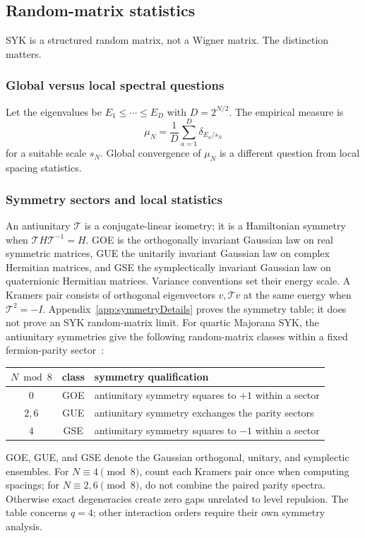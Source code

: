 \documentclass[11pt]{article}
\numberwithin{equation}{section}
\theoremstyle{exposition}
\theoremstyle{result}
\begin{document}
\subsection{Random-matrix statistics}

SYK is a structured random matrix, not a Wigner matrix. The distinction matters.

\subsubsection{Global versus local spectral questions}

Let the eigenvalues be $E_1\le\cdots\le E_D$ with $D=2^{N/2}$. The empirical measure is
\begin{equation*}
\mu_N=\frac1D\sum_{a=1}^{D}\delta_{E_a/s_N}
\end{equation*}
for a suitable scale $s_N$. Global convergence of $\mu_N$ is a different question from local spacing statistics.

\subsubsection{Symmetry sectors and local statistics}


An antiunitary $\mathcal T$ is a conjugate-linear isometry; it is a Hamiltonian symmetry when $\mathcal TH\mathcal T^{-1}=H$. GOE is the orthogonally invariant Gaussian law on real symmetric matrices, GUE the unitarily invariant Gaussian law on complex Hermitian matrices, and GSE the symplectically invariant Gaussian law on quaternionic Hermitian matrices. Variance conventions set their energy scale. A Kramers pair consists of orthogonal eigenvectors $v,\mathcal Tv$ at the same energy when $\mathcal T^2=-I$. Appendix~\ref{app:symmetryDetails} proves the symmetry table; it does not prove an SYK random-matrix limit.
For quartic Majorana SYK, the antiunitary symmetries give the following random-matrix classes within a fixed fermion-parity sector~\cite{Cotler}:
\begin{center}
\begin{tabular}{@{}ccl@{}}
\toprule
$N\bmod8$ & class & symmetry qualification \\
\midrule
$0$ & GOE & antiunitary symmetry squares to $+1$ within a sector \\
$2,6$ & GUE & antiunitary symmetry exchanges the parity sectors \\
$4$ & GSE & antiunitary symmetry squares to $-1$ within a sector \\
\bottomrule
\end{tabular}
\end{center}
GOE, GUE, and GSE denote the Gaussian orthogonal, unitary, and symplectic ensembles. For $N\equiv4\pmod8$, count each Kramers pair once when computing spacings; for $N\equiv2,6\pmod8$, do not combine the paired parity spectra. Otherwise exact degeneracies create zero gaps unrelated to level repulsion. The table concerns $q=4$; other interaction orders require their own symmetry analysis.
\end{document}
